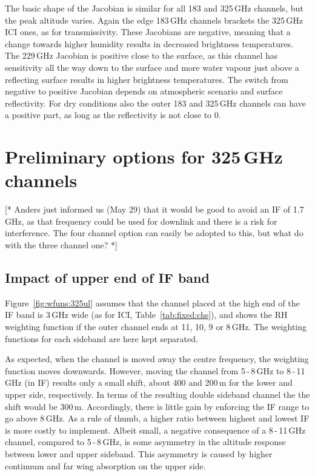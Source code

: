 \documentclass[12pt]{article}
\begin{document}
The basic shape of the Jacobian is similar for all 183 and 325\,GHz channels,
but the peak altitude varies. Again the edge 183\,GHz channels brackets the
325\,GHz ICI ones, as for transmissivity. These Jacobians are negative, meaning
that a change towards higher humidity results in decreased brightness
temperatures. The 229\,GHz Jacobian is positive close to the surface, as this
channel has sensitivity all the way down to the surface and more water vapour
just above a reflecting surface results in higher brightness temperatures. The
switch from negative to positive Jacobian depends on atmospheric scenario and
surface reflectivity. For dry conditions also the outer 183 and 325\,GHz
channels can have a positive part, as long as the reflectivity is not close to
0.


\section{Preliminary options for 325\,GHz channels}

[* Anders just informed us (May 29) that it would be good to avoid an IF of 1.7\,GHz, as that frequency could be used for downlink and there is a risk for
interference. The four channel option can easily be adopted to this, but what
do with the three channel one? *]


\subsection{Impact of upper end of IF band}
%
Figure~\ref{fig:wfuns:325ul} assumes that the channel placed at the high end of
the IF band is 3\,GHz wide (as for ICI, Table~\ref{tab:fixed:chs}), and shows
the RH weighting function if the outer channel ends at 11, 10, 9 or 8\,GHz. The
weighting functions for each sideband are here kept separated.


As expected, when the channel is moved away the centre frequency, the weighting
function moves downwards. However, moving the channel from 5\,-\,8\,GHz to
8\,-\,11\,GHz (in IF) results only a small shift, about 400 and 200\,m for the
lower and upper side, respectively. In terms of the resulting double sideband
channel the the shift would be 300\,m. Accordingly, there is little gain by
enforcing the IF range to go above 8\,GHz. As a rule of thumb, a higher ratio
between highest and lowest IF is more costly to implement. Albeit small, a
negative consequence of a 8\,-\,11\,GHz channel, compared to 5\,-\,8\,GHz, is
some asymmetry in the altitude response between lower and upper sideband. This
asymmetry is caused by higher continuum and far wing absorption on the upper
side.
\end{document}
